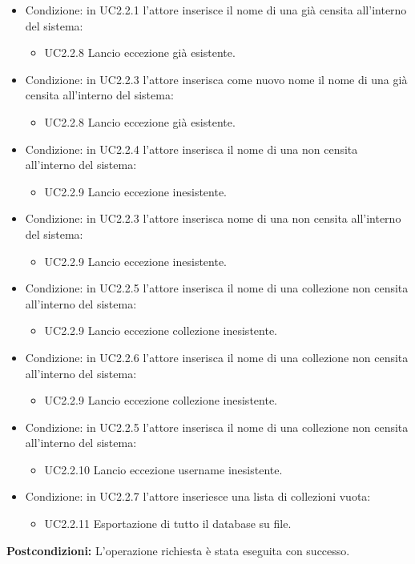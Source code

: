 \documentclass{scalatekids-article}
\begin{document}
\begin{itemize}
\item Condizione: in UC2.2.1 l'attore inserisce il nome di una  già censita all'interno del sistema:
  \begin{itemize}
  \item UC2.2.8 Lancio eccezione  già esistente.
  \end{itemize}
\item Condizione: in UC2.2.3  l'attore inserisca come nuovo nome il nome di una  già censita all'interno del sistema:
  \begin{itemize}
  \item UC2.2.8 Lancio eccezione  già esistente.
  \end{itemize}
\item Condizione: in UC2.2.4 l'attore inserisca il nome di una  non censita all'interno del sistema:
  \begin{itemize}
  \item UC2.2.9 Lancio eccezione  inesistente.
  \end{itemize}
\item Condizione: in UC2.2.3 l'attore inserisca nome di una  non censita all'interno del sistema:
  \begin{itemize}
  \item UC2.2.9 Lancio eccezione  inesistente.
  \end{itemize}
\item Condizione: in UC2.2.5 l'attore inserisca il nome di una collezione non censita all'interno del sistema:
  \begin{itemize}
  \item UC2.2.9 Lancio eccezione collezione inesistente.
  \end{itemize}
\item Condizione: in UC2.2.6 l'attore inserisca il nome di una collezione non censita all'interno del sistema:
  \begin{itemize}
  \item UC2.2.9 Lancio eccezione collezione inesistente.
  \end{itemize}
\item Condizione: in UC2.2.5 l'attore inserisca il nome di una collezione non censita all'interno del sistema:
  \begin{itemize}
  \item UC2.2.10 Lancio eccezione username inesistente.
  \end{itemize}
\item Condizione: in UC2.2.7 l'attore inseriesce una lista di collezioni vuota:
  \begin{itemize}
  \item UC2.2.11 Esportazione di tutto il database su file.
  \end{itemize}
\end{itemize}
\textbf{Postcondizioni:} L'operazione richiesta è stata eseguita con successo.
\end{document}
